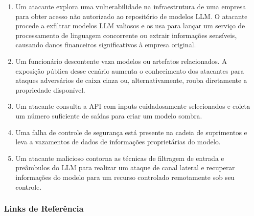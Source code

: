 \documentclass[
]{article}
\providecommand{\tightlist}{%
  \setlength{\itemsep}{0pt}\setlength{\parskip}{0pt}}
\begin{document}
\begin{enumerate}
\def\labelenumi{\arabic{enumi}.}
\tightlist
\item
  Um atacante explora uma vulnerabilidade na infraestrutura de uma
  empresa para obter acesso não autorizado ao repositório de modelos
  LLM. O atacante procede a exfiltrar modelos LLM valiosos e os usa para
  lançar um serviço de processamento de linguagem concorrente ou extrair
  informações sensíveis, causando danos financeiros significativos à
  empresa original.
\item
  Um funcionário descontente vaza modelos ou artefatos relacionados. A
  exposição pública desse cenário aumenta o conhecimento dos atacantes
  para ataques adversários de caixa cinza ou, alternativamente, rouba
  diretamente a propriedade disponível.
\item
  Um atacante consulta a API com inputs cuidadosamente selecionados e
  coleta um número suficiente de saídas para criar um modelo sombra.
\item
  Uma falha de controle de segurança está presente na cadeia de
  suprimentos e leva a vazamentos de dados de informações proprietárias
  do modelo.
\item
  Um atacante malicioso contorna as técnicas de filtragem de entrada e
  preâmbulos do LLM para realizar um ataque de canal lateral e recuperar
  informações do modelo para um recurso controlado remotamente sob seu
  controle.
\end{enumerate}

\subsubsection{Links de Referência}\label{links-de-referuxeancia}
\end{document}
